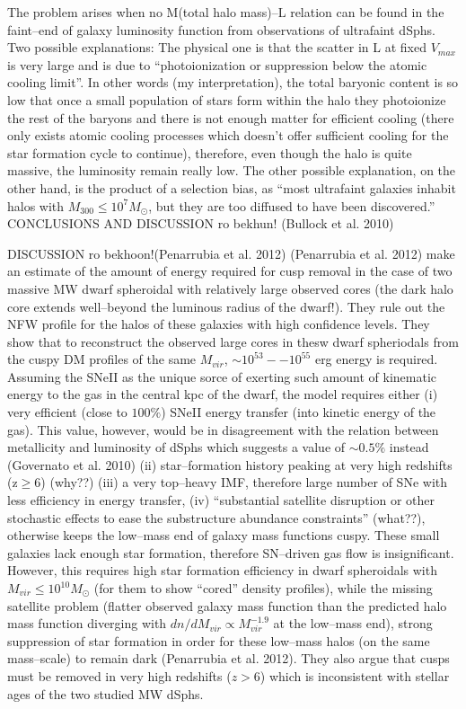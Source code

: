 \documentclass[paper=a4, fontsize=11pt]{scrartcl} %
\numberwithin{equation}{section} %
\numberwithin{figure}{section} %
\numberwithin{table}{section} %
\begin{document}
The problem arises when no M(total halo mass)--L relation can be found in the faint--end of galaxy luminosity function from observations of ultrafaint dSphs. Two possible explanations: The physical one is that the scatter in L at fixed $V_{max}$ is very large and is due to ``photoionization or suppression below the atomic cooling limit''. In other words (my interpretation), the total baryonic content is so low that once a small population of stars form within the halo they photoionize the rest of the baryons and there is not enough matter for efficient cooling (there only exists atomic cooling processes which doesn't offer sufficient cooling for the star formation cycle to continue), therefore, even though the halo is quite massive, the luminosity remain really low. The other possible explanation, on the other hand, is the product of a selection bias, as ``most ultrafaint galaxies inhabit halos with $M_{300}\leq 10^7 M_\odot$, but they are too diffused to have been discovered.'' 
CONCLUSIONS AND DISCUSSION ro bekhun! (Bullock et al. 2010)

DISCUSSION ro bekhoon!(Penarrubia et al. 2012)
({Penarrubia et al. 2012}) make an estimate of the amount of energy required for cusp removal in the case of two massive MW dwarf spheroidal with relatively large observed cores (the dark halo core extends well--beyond the luminous radius of the dwarf!). They rule out the NFW profile for the halos of these galaxies with high confidence levels. They show that to reconstruct the observed large cores in thesw dwarf spheriodals from the cuspy DM profiles of the same $M_{vir}$, $\sim 10^{53} -- 10^{55}$ erg energy is required. Assuming the SNeII as the unique sorce of exerting such amount of kinematic energy to the gas in the central kpc of the dwarf, the model requires either (i) very efficient (close to $100\%$) SNeII energy transfer (into kinetic energy of the gas). This value, however, would be in disagreement with the relation between metallicity and luminosity of dSphs which suggests a value of $\sim 0.5\%$ instead (Governato et al. 2010) (ii) star--formation history peaking at very high redshifts (z$\geq$6) (why??) (iii) a very top--heavy IMF, therefore large number of SNe with less efficiency in energy transfer, (iv) ``substantial satellite disruption or other stochastic effects to ease the substructure abundance constraints'' (what??), otherwise keeps the low--mass end of galaxy mass functions cuspy. These small galaxies lack enough star formation, therefore SN--driven gas flow is insignificant. However, this requires high star formation efficiency in dwarf spheroidals with $M_{vir} \leq 10^{10}M_\odot$ (for them to show ``cored'' density profiles), while the missing satellite problem (flatter observed galaxy mass function than the predicted halo mass function diverging with $dn/dM_{vir} \propto M_{vir}^{-1.9}$ at the low--mass end),  strong suppression of star formation in order for these low--mass halos (on the same mass--scale) to remain dark (Penarrubia et al. 2012). They also argue that cusps must be removed in very high redshifts ($z > 6$) which is inconsistent with stellar ages of the two studied MW dSphs.
\end{document}
